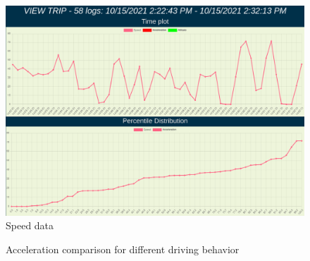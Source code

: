 \begin{figure}[H]
\centering
\includegraphics[width=5in]{eval_speed.png}
\caption{Speed data}
\label{fig:eval_speed}
\end{figure}

\begin{figure}[H]
\centering
\caption{Acceleration comparison for different driving behavior}
\label{fig:accel}
\end{figure}

